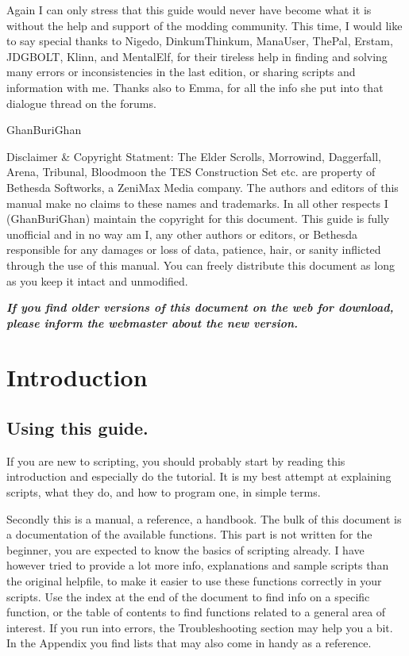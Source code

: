 \documentclass[oneside]{article}
\begin{document}
Again I can only stress that this guide would never have become what it is without the help and support of the modding community. This time, I would like to say special thanks to Nigedo, DinkumThinkum, ManaUser, ThePal, Erstam, JDGBOLT, Klinn, and MentalElf, for their tireless help in finding and solving many errors or inconsistencies in the last edition, or sharing scripts and information with me. Thanks also to Emma, for all the info she put into that dialogue thread on the forums.

GhanBuriGhan

Disclaimer \& Copyright Statment: The Elder Scrolls, Morrowind, Daggerfall, Arena, Tribunal, Bloodmoon the TES Construction Set etc. are property of Bethesda Softworks, a ZeniMax Media company. The authors and editors of this manual make no claims to these names and trademarks. In all other respects I (GhanBuriGhan) maintain the copyright for this document. This guide is fully unofficial and in no way am I, any other authors or editors, or Bethesda responsible for any damages or loss of data, patience, hair, or sanity inflicted through the use of this manual. You can freely distribute this document as long as you keep it intact and unmodified.

\emph{\textbf{If you find older versions of this document on the web for
download, please inform the webmaster about the new version.}}


\section{Introduction}

\hypertarget{using-this-guide.}{%
\subsection{Using this guide.}\label{using-this-guide.}}

If you are new to scripting, you should probably start by reading this introduction and especially do the tutorial. It is my best attempt at explaining scripts, what they do, and how to program one, in simple terms.

Secondly this is a manual, a reference, a handbook. The bulk of this document is a documentation of the available functions. This part is not written for the beginner, you are expected to know the basics of scripting already. I have however tried to provide a lot more info, explanations and sample scripts than the original helpfile, to make it easier to use these functions correctly in your scripts. Use the index at the end of the document to find info on a specific function, or the table of contents to find functions related to a general area of
interest. If you run into errors, the Troubleshooting section may help you a bit. In the Appendix you find lists that may also come in handy as a reference.
\end{document}
